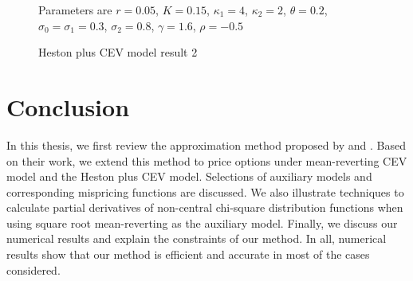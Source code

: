 \begin{figure}[ht]
  \hfill
  \caption{Heston plus CEV model result 2}
  \small{Parameters are $r=0.05$, $K=0.15$, $\kappa_1=4$, $\kappa_2=2$, $\theta=0.2$, $\sigma_0=\sigma_1=0.3$, $\sigma_2=0.8$, $\gamma=1.6$, $\rho=-0.5$}
  \label{2d price comparison2}
\end{figure}

\chapter{Conclusion}\label{ch5}

In this thesis, we first review the approximation method proposed by \cite{heath_variance_2002} and \cite{kristensen_adding_2011}. Based on their work, we extend this method to price options under mean-reverting CEV model and the Heston plus CEV model. Selections of auxiliary models and corresponding mispricing functions are discussed. We also illustrate techniques to calculate partial derivatives of non-central chi-square distribution functions when using square root mean-reverting as the auxiliary model. Finally, we discuss our numerical results and explain the constraints of our method. In all, numerical results show that our method is efficient and accurate in most of the cases considered.